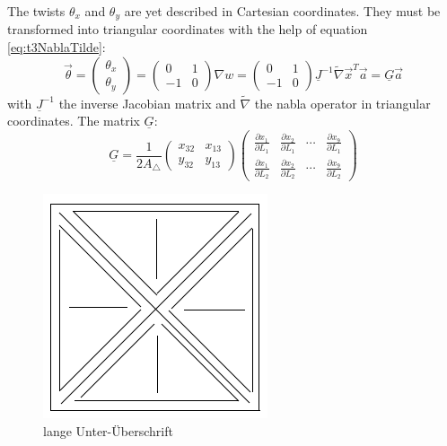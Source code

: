   The twists $\theta_x$ and $\theta_y$ are yet described in Cartesian coordinates. They must be transformed into triangular coordinates with the help of equation \ref{eq:t3NablaTilde}:
  \begin{equation}
  \vec{\theta} = \begin{pmatrix}
  \theta_x\\\theta_y
  \end{pmatrix} = \begin{pmatrix}
  0 & 1 \\ -1 & 0
  \end{pmatrix} \nabla w = \begin{pmatrix}
  0 & 1 \\ -1 & 0
  \end{pmatrix} \underline{J}^{-1} \tilde{\nabla} \vec{x}^T \vec{a} = \underline{G} \vec{a}
  \end{equation}
  with $\underline{J}^{-1}$ the inverse Jacobian matrix and $\tilde{\nabla}$ the nabla operator in triangular coordinates. The matrix $\underline{G}$:
  \begin{equation}
  \underline{G} = \frac{1}{2 A_\triangle} \begin{pmatrix}
  x_{32} & x_{13} \\ y_{32} & y_{13}
  \end{pmatrix} \begin{pmatrix}
  \frac{\partial x_1}{\partial L_1} & \frac{\partial x_2}{\partial L_1} & \cdots & \frac{\partial x_9}{\partial L_1} \\
  \frac{\partial x_1}{\partial L_2} & \frac{\partial x_2}{\partial L_2} & \cdots & \frac{\partial x_9}{\partial L_2}
  \end{pmatrix}
  \end{equation}
  \begin{figure} %
  	\centering
  	\includegraphics[width=0.7\linewidth]{figures/platzhalter}
  	\caption[kurze Unter-Überschrift]{lange Unter-Überschrift}
  	\label{fig:platzhalter}
  \end{figure}

